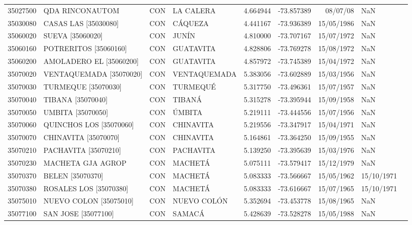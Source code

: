 \begin{landscape}
\begin{longtable}{lp{4cm}lp{3cm}lrrll}
   35027500 &             QDA RINCONAUTOM &  CON &         LA CALERA &  4.664944 & -73.857389 &    08/07/08 &         NaN \\
   35030080 &        CASAS LAS [35030080] &  CON &           CÁQUEZA &  4.441167 & -73.936389 &  15/05/1986 &         NaN \\
   35060020 &            SUEVA [35060020] &  CON &             JUNÍN &  4.810000 & -73.707167 &  15/07/1972 &         NaN \\
   35060160 &       POTRERITOS [35060160] &  CON &         GUATAVITA &  4.828806 & -73.769278 &  15/08/1972 &         NaN \\
   35060200 &     AMOLADERO EL [35060200] &  CON &         GUATAVITA &  4.857972 & -73.745389 &  15/04/1972 &         NaN \\
   35070020 &  VENTAQUEMADA    [35070020] &  CON &      VENTAQUEMADA &  5.383056 & -73.602889 &  15/03/1956 &         NaN \\
   35070030 &      TURMEQUE    [35070030] &  CON &          TURMEQUÉ &  5.317750 & -73.496361 &  15/07/1957 &         NaN \\
   35070040 &           TIBANA [35070040] &  CON &            TIBANÁ &  5.315278 & -73.395944 &  15/09/1958 &         NaN \\
   35070050 &           UMBITA [35070050] &  CON &            ÚMBITA &  5.219111 & -73.444556 &  15/07/1956 &         NaN \\
   35070060 &   QUINCHOS LOS   [35070060] &  CON &         CHINAVITA &  5.219556 & -73.347917 &  15/04/1971 &         NaN \\
   35070070 &     CHINAVITA    [35070070] &  CON &         CHINAVITA &  5.164861 & -73.364250 &  15/09/1955 &         NaN \\
   35070210 &        PACHAVITA [35070210] &  CON &         PACHAVITA &  5.139250 & -73.395639 &  15/03/1976 &         NaN \\
   35070230 &           MACHETA GJA AGROP &  CON &           MACHETÁ &  5.075111 & -73.579417 &  15/12/1979 &         NaN \\
   35070370 &            BELEN [35070370] &  CON &           MACHETÁ &  5.083333 & -73.566667 &  15/05/1962 &  15/10/1971 \\
   35070380 &      ROSALES LOS [35070380] &  CON &           MACHETÁ &  5.083333 & -73.616667 &  15/07/1965 &  15/10/1971 \\
   35075010 &    NUEVO COLON   [35075010] &  CON &       NUEVO COLÓN &  5.352694 & -73.453778 &  15/08/1965 &         NaN \\
   35077100 &       SAN JOSE   [35077100] &  CON &            SAMACÁ &  5.428639 & -73.528278 &  15/05/1988 &         NaN \\
\end{longtable}



\end{landscape}
